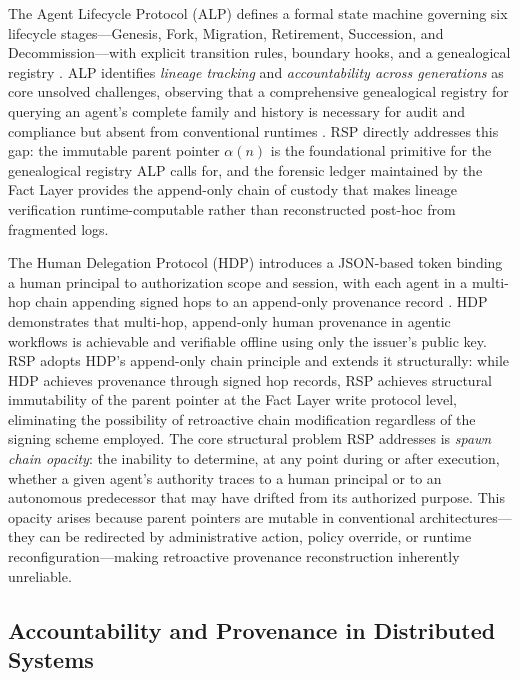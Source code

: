 The Agent Lifecycle Protocol (ALP) defines a formal state machine governing six lifecycle stages---Genesis, Fork, Migration, Retirement, Succession, and Decommission---with explicit transition rules, boundary hooks, and a genealogical registry \cite{alp2025}. ALP identifies \emph{lineage tracking} and \emph{accountability across generations} as core unsolved challenges, observing that a comprehensive genealogical registry for querying an agent's complete family and history is necessary for audit and compliance but absent from conventional runtimes \cite{alp2025}. RSP directly addresses this gap: the immutable parent pointer $\alpha(n)$ is the foundational primitive for the genealogical registry ALP calls for, and the forensic ledger maintained by the Fact Layer provides the append-only chain of custody that makes lineage verification runtime-computable rather than reconstructed post-hoc from fragmented logs.

The Human Delegation Protocol (HDP) introduces a JSON-based token binding a human principal to authorization scope and session, with each agent in a multi-hop chain appending signed hops to an append-only provenance record \cite{hdp-draft,hdp-draft-2}. HDP demonstrates that multi-hop, append-only human provenance in agentic workflows is achievable and verifiable offline using only the issuer's public key. RSP adopts HDP's append-only chain principle and extends it structurally: while HDP achieves provenance through signed hop records, RSP achieves structural immutability of the parent pointer at the Fact Layer write protocol level, eliminating the possibility of retroactive chain modification regardless of the signing scheme employed. The core structural problem RSP addresses is \emph{spawn chain opacity}: the inability to determine, at any point during or after execution, whether a given agent's authority traces to a human principal or to an autonomous predecessor that may have drifted from its authorized purpose. This opacity arises because parent pointers are mutable in conventional architectures---they can be redirected by administrative action, policy override, or runtime reconfiguration---making retroactive provenance reconstruction inherently unreliable.

\subsection{Accountability and Provenance in Distributed Systems}

